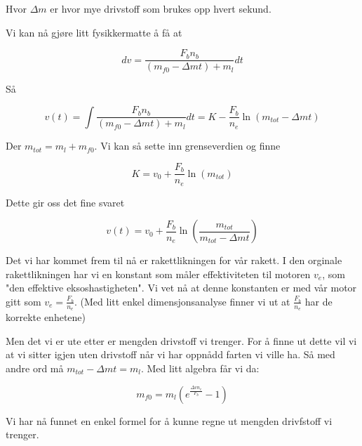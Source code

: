 \documentclass[a4paper,norsk,11pt,twoside]{article}
\begin{document}
Hvor $\Delta m$ er hvor mye drivstoff som brukes opp hvert sekund.

Vi kan nå gjøre litt fysikkermatte å få at

\begin{equation}
dv = \frac{F_b n_b}{(m_{f0} - \Delta m t) + m_l} dt
\end{equation} 

Så

\begin{equation}
v(t) = \int \frac{F_b n_b}{(m_{f0} - \Delta m t) + m_l} dt
= K - \frac{F_b}{n_e} \ln(m_{tot} - \Delta m t) 
\end{equation}

Der $m_{tot} = m_l + m_{f0}$. Vi kan så sette inn grenseverdien og finne

\begin{equation}
K = v_0 + \frac{F_b}{n_e} \ln (m_{tot})
\end{equation}

Dette gir oss det fine svaret

\begin{equation}
v(t) =v_0 + \frac{F_b}{n_e} \ln \left(\frac{m_{tot}}{m_{tot} - \Delta m t} \right)
\end{equation}

Det vi har kommet frem til nå er rakettlikningen for vår rakett. I den orginale rakettlikningen har vi en konstant som måler effektiviteten til motoren $v_e$, som "den effektive eksoshastigheten". Vi vet nå at denne konstanten er med vår motor gitt som $v_e = \frac{F_b}{n_e}$. (Med litt enkel dimensjonsanalyse finner vi ut at $\frac{F_b}{n_e}$ har de korrekte enhetene)

Men det vi er ute etter er mengden drivstoff vi trenger. For å finne ut dette vil vi at vi sitter igjen uten drivstoff når vi har oppnådd farten vi ville ha. Så med andre ord må $m_{tot} - \Delta m t = m_l$. Med litt algebra får vi da:

\begin{equation}
m_{f0} = m_l(e^{\frac{\Delta v n_e}{F_b}} - 1)
\end{equation}

Vi har nå funnet en enkel formel for å kunne regne ut mengden drivfstoff vi trenger.





\end{document}
